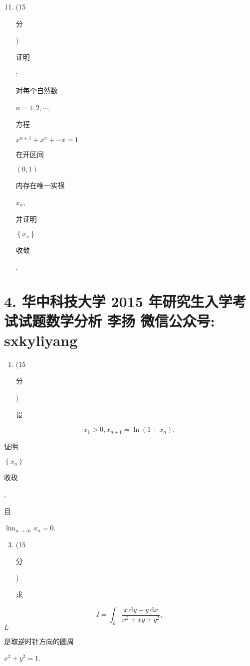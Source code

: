 \documentclass[10pt]{article}
\begin{document}
\begin{enumerate}
  \setcounter{enumi}{10}
  \item (15\begin{CJK}{UTF8}{mj}分\end{CJK}) \begin{CJK}{UTF8}{mj}证明\end{CJK}: \begin{CJK}{UTF8}{mj}对每个自然数\end{CJK} $n=1,2, \cdots$, \begin{CJK}{UTF8}{mj}方程\end{CJK} $x^{n+1}+x^{n}+\cdots x=1$ \begin{CJK}{UTF8}{mj}在开区间\end{CJK} $(0,1)$ \begin{CJK}{UTF8}{mj}内存在唯一实根\end{CJK} $x_{n}$, \begin{CJK}{UTF8}{mj}并证明\end{CJK} $\left\{x_{n}\right\}$ \begin{CJK}{UTF8}{mj}收敛\end{CJK}.
\end{enumerate}
\section{4. 华中科技大学 2015 年研究生入学考试试题数学分析 
 李扬 
 微信公众号: sxkyliyang}
\begin{enumerate}
  \item (15 \begin{CJK}{UTF8}{mj}分\end{CJK}) \begin{CJK}{UTF8}{mj}设\end{CJK}
\end{enumerate}
$$
x_{1}>0, x_{n+1}=\ln \left(1+x_{n}\right),
$$
\begin{CJK}{UTF8}{mj}证明\end{CJK} $\left\{x_{n}\right\}$ \begin{CJK}{UTF8}{mj}收玫\end{CJK}, \begin{CJK}{UTF8}{mj}且\end{CJK} $\lim _{n \rightarrow \infty} x_{n}=0$.

\begin{enumerate}
  \setcounter{enumi}{2}
  \item (15 \begin{CJK}{UTF8}{mj}分\end{CJK}) \begin{CJK}{UTF8}{mj}求\end{CJK}
\end{enumerate}
$$
I=\int_{L} \frac{x \mathrm{~d} y-y \mathrm{~d} x}{x^{2}+x y+y^{2}},
$$
$L$ \begin{CJK}{UTF8}{mj}是取逆时针方向的圆周\end{CJK} $x^{2}+y^{2}=1$.
\end{document}
